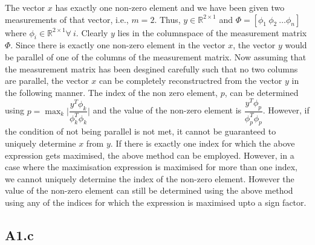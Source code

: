 \documentclass{article}
\begin{document}
The vector $x$ has exactly one non-zero element and we have been given two measurements of that vector, i.e., $ m =2$. Thus, $ y \in \mathbb{R}^{2 \times 1} $ and $ \Phi = [ \phi_1 \ \phi_2 \ \dots \phi_n] $ where $ \phi_i \in \mathbb{R}^{2 \times 1} \forall \ i $. Clearly $y$ lies in the columnspace of the measurement matrix $\Phi$. Since there is exactly one non-zero element in the vector $x$, the vector $y$ would be parallel of one of the columns of the measurement matrix. Now assuming that the measurement matrix has been desgined carefully such that no two columns are parallel, the vector $x$ can be completely reconstructred from the vector $y$ in the following manner. The index of the non zero element, $p$,  can be determined using $ p = \operatorname*{\max}_k \bigg| \dfrac{y^T \phi_k}{\phi_k^T \phi_k} \bigg|$ and the value of the non-zero element is $\dfrac{y^T \phi_p}{\phi_p^T \phi_p} $. However, if the condition of not being parallel is not met, it cannot be guaranteed to uniquely determine $x$ from $y$. If there is exactly one index for which the above expression gets maximised, the above method can be employed. However, in a case where the maximisation expression is maximised for more than one index, we cannot uniquely determine the index of the non-zero element. However the value of the non-zero element can still be determined using the above method using any of the indices for which the expression is maximised upto a sign factor. 


\subsection*{A1.c}
\end{document}
